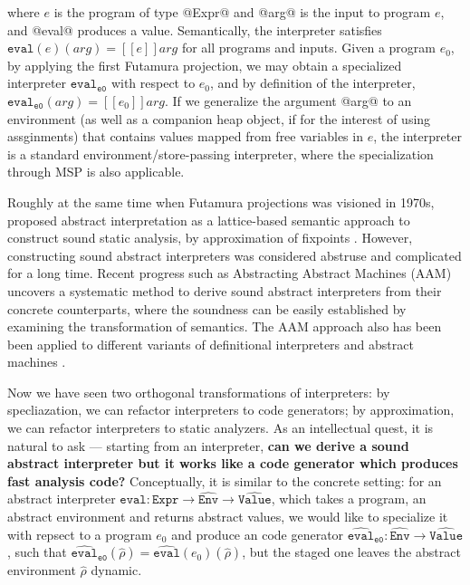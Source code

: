 where $e$ is the program of type @Expr@ and @arg@ is the input to program $e$,
and @eval@ produces a value.
Semantically, the interpreter satisfies $ \texttt{eval}(e)(arg) = [\![ e ]\!] arg$ for all
programs and inputs. Given a program $e_0$, by applying the first Futamura
projection, we may obtain a specialized interpreter
$\texttt{eval}_{\texttt{e0}}$ with respect to $e_0$, and by definition of the interpreter, 
$\texttt{eval}_{\texttt{e0}}(arg) = [\![ e_0 ]\!] arg $. If we generalize the
argument @arg@ to an environment (as well as a companion heap object, if for the
interest of using assginments) that contains values mapped from free variables
in $e$, the interpreter is a standard environment/store-passing interpreter,
where the specialization through MSP is also applicable.

Roughly at the same time when Futamura projections was visioned in 1970s,
\citeauthor{DBLP:conf/popl/CousotC77} proposed abstract interpretation as a
lattice-based semantic approach to construct sound static analysis, by
approximation of fixpoints \cite{DBLP:conf/popl/CousotC77}. However,
constructing sound abstract interpreters was considered abstruse and complicated
for a long time.
Recent progress such as Abstracting Abstract Machines (AAM)
uncovers a systematic method to derive sound abstract interpreters from their
concrete counterparts, where the soundness can be easily established by
examining the transformation of semantics.
The AAM approach also has been been applied to different variants of
definitional interpreters and abstract machines \cite{DBLP:journals/jfp/HornM12,
DBLP:conf/icfp/HornM10, DBLP:journals/pacmpl/DaraisLNH17}.

Now we have seen two orthogonal transformations of interpreters: by
specliazation, we can refactor interpreters to code generators; by approximation,
we can refactor interpreters to static analyzers. As an intellectual quest, it
is natural to ask --- starting from an interpreter, \textbf{can we derive a
sound abstract interpreter but it works like a code generator which produces fast
analysis code?} Conceptually, it is similar to the concrete setting: for an
abstract interpreter $\widehat{\texttt{eval}}: \texttt{Expr} \to
\widehat{\texttt{Env}} \to \widehat{\texttt{Value}}$, which takes a program, an abstract
environment and returns abstract values, we would like to specialize it with
repsect to a program $e_0$ and produce an code generator
$\widehat{\texttt{eval}}_{\texttt{e0}} : \widehat{\texttt{Env}} \to
\widehat{\texttt{Value}}$, such that $
\widehat{\texttt{eval}}_{\texttt{e0}}(\widehat{\rho}) =
\widehat{\texttt{eval}}(e_0)(\widehat{\rho})$, but the staged one leaves the
abstract environment $\widehat{\rho}$ dynamic.

